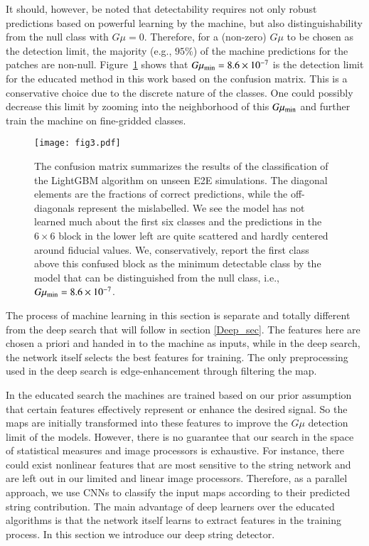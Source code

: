 \documentclass[fleqn,usenatbib]{mnras}
\begin{document}
It should, however, be noted that detectability requires not only robust predictions based on powerful learning by the machine, but also distinguishability from the null class with  $G\mu=0$. 
Therefore, for a (non-zero) $G\mu$ to be chosen as the detection limit,  the majority (e.g., $95\%$) of the machine predictions for the patches are non-null. Figure~\ref{fig:conflgbm} shows that $G\mu_{\rm min}= 8.6 \times 10^{-7}$ is the detection limit for the educated method in this work based on the confusion matrix.
This is a conservative choice due to the discrete nature of the classes. One could possibly decrease this limit by zooming into the neighborhood of this $G\mu_{\rm min}$ and further train the machine on fine-gridded classes. 

\begin{figure}
	\centering
	\texttt{[image: fig3.pdf]}
	\caption{The confusion matrix summarizes  the results of the classification of the  LightGBM algorithm on unseen E2E simulations. The diagonal elements are the fractions of correct predictions, while the off-diagonals represent the mislabelled. We see the model has not learned much about the first six classes and the  predictions in the $6\times6$ block in the lower left are quite scattered and hardly centered around fiducial values. We, conservatively, report the first class above this confused block as the minimum detectable class by the model that can be distinguished from the null class, i.e., $G\mu_{\rm min}=8.6\times10^{-7}$.}
	\label{fig:conflgbm}
\end{figure}
The process of machine learning in this section is separate and totally different from the deep search that will follow in section \ref{Deep_sec}. 
The  features here are chosen a priori and handed in to the machine as inputs, while in the deep search, the network itself selects the best features for training. The only preprocessing used in the deep search is  edge-enhancement through filtering the map.

In the educated search
the machines are trained based on our prior assumption that certain features effectively represent or enhance the desired signal. So the maps are initially transformed into these features to improve the $G\mu$ detection limit   
of the models. 
%
However, there is no guarantee that  our search in the space of statistical measures and image processors is exhaustive. 
 For instance,  there could exist nonlinear features that are most sensitive to the string network and are left out in our limited and linear image processors. 
Therefore, as a parallel approach, we use CNNs to classify the input maps according to their predicted string contribution. 
The main advantage of deep learners over the educated algorithms is that the network itself learns to extract features in the training process. 
In this section we introduce our deep string detector. 
\end{document}
